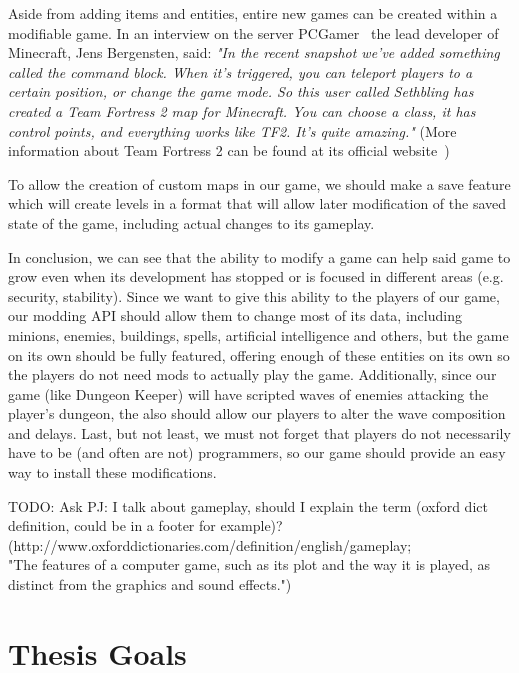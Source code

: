 Aside from adding items and entities, entire new games can be created within a modifiable game. 
In an interview on the server PCGamer~\cite{FutureOfMinecraft}
the lead developer of Minecraft, Jens Bergensten, said:
\emph{"In the recent snapshot we've added something called the command block. When it's triggered, 
you can teleport players to a certain position, or change the game mode.
So this user called Sethbling has created a Team Fortress 2 map for Minecraft. 
You can choose a class, it has control points, and everything works like TF2. It's quite amazing."}
(More information about Team Fortress 2 can be found at its official website~\cite{TF2})

To allow the creation of custom maps in our game, we should make a save feature which will create levels
in a format that will allow later modification of the saved state of the game, including actual changes to its gameplay.

In conclusion, we can see that the ability to modify a game can help said game to grow even when its development has stopped
or is focused in different areas (e.g. security, stability). Since we want to give this ability to the players of
our game, our modding API should allow them to change most of its data, including minions, enemies, buildings, spells,
artificial intelligence and others, but the game on its own should be fully featured, offering enough of these entities
on its own so the players do not need mods to actually play the game. Additionally, since our game (like Dungeon Keeper)
will have scripted waves of enemies attacking the player's dungeon, the also should allow our players to alter the wave 
composition and delays. Last, but not least, we must not forget that players do not necessarily have to be (and often are not)
programmers, so our game should provide an easy way to install these modifications.

\bigskip
TODO: Ask PJ: I talk about gameplay, should I explain the term (oxford dict definition, could be in a footer for example)?
\\
(http://www.oxforddictionaries.com/definition/english/gameplay; 
\\
"The features of a computer game, such as its plot and the way it is played, as distinct from the graphics and sound effects.")
\bigskip

\section{Thesis Goals}


